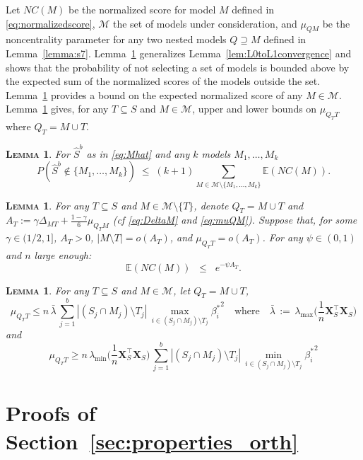 \documentclass[aos]{imsart}
\theoremstyle{plain}
\newtheorem{lem}[thm]{\textsc{Lemma}}
\newcommand{\E}{\mathbb{E}}
\newcommand{\M}{\mathcal{M}}
\newcommand{\bs}{\boldsymbol}
\begin{document}
Let $NC(M)$ be the normalized score for model $M$ defined in \eqref{eq:normalizedscore}, $\M$ the set of models under consideration, and $\mu_{Q M}$ be the noncentrality parameter for any two nested models $Q \supseteq M$ defined in Lemma~\ref{lemma:s7}. Lemma~\ref{lem:L0toL1convergencegen} generalizes Lemma~\ref{lem:L0toL1convergence} and shows that the probability of not selecting a set of models is bounded above by the expected sum of the normalized scores of the models outside the set. Lemma~\ref{lem:boundexpnc} provides a bound on the expected normalized score of any $M \in \M$. Lemma~\ref{lem:upperboundnoncentralgen} gives, for any $T\subseteq S$ and $M\in \M$, upper and lower bounds on $\mu_{Q_TT}$ where $Q_T=M\cup T$.

\begin{lem}\label{lem:L0toL1convergencegen} For $\hat S^b$ as in \eqref{eq:Mhat} and any $k$ models $M_1,\ldots,M_k$
$$P(\hat{S}^b\not\in \{M_1,\ldots,M_k\})\;\leq\; (k+1) \sum_{M \in \M\setminus \{M_1,\ldots,M_k\}}\E\left( NC(M)\right).$$
\end{lem}

\begin{lem}\label{lem:boundexpnc} For any $T\subseteq S$ and $M\in \M\setminus\{T\}$, denote $Q_T= M\cup T$ and $A_T:=\gamma\Delta_{MT}+\tfrac{1-\gamma}{6}\mu_{Q_TM}$ (cf \eqref{eq:DeltaM} and \eqref{eq:muQM}). Suppose that, for some $\gamma \in (1/2,1]$, $A_T>0$, $|M\setminus T|=o(A_T)$, and $\mu_{Q_T T}=o(A_T)$. For any $\psi\in(0,1)$ and $n$ large enough:
$$\E\left(NC(M)\right)  \;\;\leq\;\; e^{-\psi A_T}.$$
\end{lem}

\begin{lem}\label{lem:upperboundnoncentralgen}
    For any $T\subseteq S$ and $M\in \M$, let $Q_T=M\cup T$, $$\mu_{Q_TT} \leq n\,\bar{\lambda}\,\sum_{j=1}^b|(S_j\cap M_j )\setminus T_j|\,\max_{i\in (S_j\cap M_j )\setminus T_j}{\beta_{i}^*}^2 \quad \text{where}\quad \bar{\lambda}\,:=\,\lambda_{\max}\Big(\frac1n \bs X_{S}^\top\bs X_{S}\Big)$$
    and
    $$\mu_{Q_TT} \geq n\,\lambda_{\min}\Big(\frac1n \bs X_{S}^\top\bs X_{S}\Big)\,\sum_{j=1}^b|(S_j\cap M_j )\setminus T_j|\,\min_{i\in (S_j\cap M_j )\setminus T_j}{\beta_{i}^*}^2$$
\end{lem}

\section{Proofs of Section~\ref{sec:properties_orth}}
 
\end{document}
